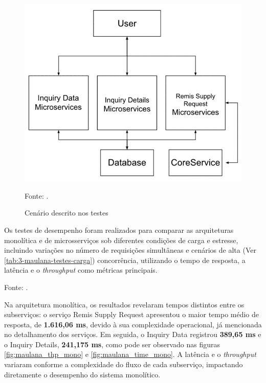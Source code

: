 \begin{figure}
    \caption{Cenário descrito nos testes}
    \label{fig:3-maulana-scenario}
    \centering
    \includegraphics[width=0.5\linewidth]{imagens/maulana_scenario.jpg}    
    {\par \raggedright \footnotesize Fonte: \textcite{maulana_design_2022}.\par}
\end{figure}

Os testes de desempenho foram realizados para comparar as arquiteturas monolítica e de microsserviços sob diferentes condições de carga e estresse, incluindo variações no número de requisições simultâneas e cenários de alta (Ver \autoref{tab:3-maulana-testes-carga}) concorrência, utilizando o tempo de resposta, a latência e o \textit{throughput} como métricas principais. 

\begin{table}[H]
\centering
\caption{Condições de carga e estresse}
\label{tab:3-maulana-testes-carga}
{\par \raggedright \footnotesize Fonte: \textcite{maulana_design_2022}.\par}
\end{table}

Na arquitetura monolítica, os resultados revelaram tempos distintos entre os subserviços: o serviço Remis Supply Request apresentou o maior tempo médio de resposta, de \textbf{1.616,06 ms}, devido à sua complexidade operacional, já mencionada no detalhamento dos serviços. Em seguida, o Inquiry Data registrou \textbf{389,65 ms} e o Inquiry Details, \textbf{241,175 ms}, como pode ser observado nas figuras \ref{fig:maulana_thp_mono} e \ref{fig:maulana_time_mono}. A latência e o \textit{throughput} variaram conforme a complexidade do fluxo de cada subserviço, impactando diretamente o desempenho do sistema monolítico.



